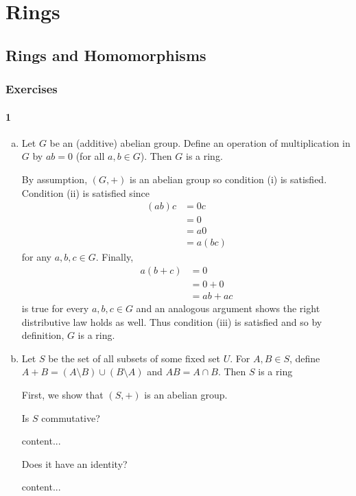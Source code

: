 \chapter{Rings}


\section{Rings and Homomorphisms}
\subsection{Exercises}
\subsubsection{1}
\begin{enumerate}[(a)]
	\item
	\begin{graybox}
		Let $G$ be an (additive) abelian group. Define an operation of multiplication in $G$ by $ab = 0$ (for all $a, b\in G$). Then $G$ is a ring.
	\end{graybox}
	\begin{solution}
		By assumption, $(G, +)$ is an abelian group so condition (i) is satisfied. Condition (ii) is satisfied since
		\begin{align*}
			(ab)c &= 0c\\
			&= 0\\
			&= a0\\
			&= a(bc)
		\end{align*}
		for any $a,b,c \in G$. Finally,
		\begin{align*}
			a(b + c) &= 0\\
			&= 0 + 0\\
			&= ab + ac
		\end{align*}
		is true for every $a,b,c \in G$ and an analogous argument shows the right distributive law holds as well. Thus condition (iii) is satisfied and so by definition, $G$ is a ring. 
	\end{solution}
	\item
	\begin{graybox}
		Let $S$ be the set of all subsets of some fixed set $U$. For $A, B \in S$, define $A + B = (A \setminus B) \cup (B \setminus A)$ and $AB = A \cap B$. Then $S$ is a ring
	\end{graybox}
	\begin{solution}
		First, we show that $(S, +)$ is an abelian group. 
	\end{solution}
	\begin{lightgraybox}
		Is $S$ commutative?
	\end{lightgraybox}
	\begin{solution}
		content...
	\end{solution}
	\begin{lightgraybox}
		Does it have an identity?
	\end{lightgraybox}
	\begin{solution}
		content...
	\end{solution}
\end{enumerate}